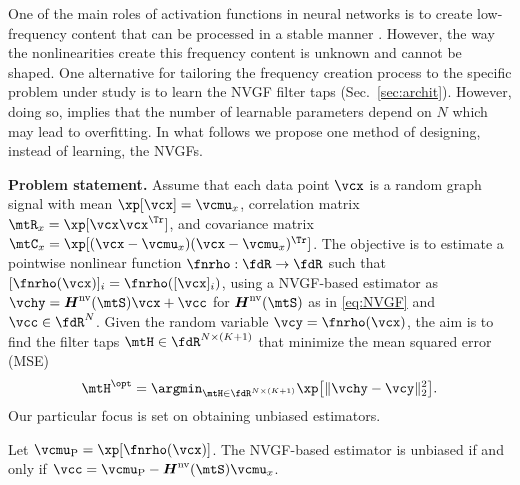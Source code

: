 

One of the main roles of activation functions in neural networks is to create low-frequency content that can be processed in a stable manner \cite{Mallat2012-Scattering}. However, the way the nonlinearities create this frequency content is unknown and cannot be shaped. One alternative for tailoring the frequency creation process to the specific problem under study is to learn the NVGF filter taps (Sec.~\ref{sec:archit}). However, doing so, implies that the number of learnable parameters depend on $N$ which may lead to overfitting. In what follows we propose one method of designing, instead of learning, the NVGFs.

\textbf{Problem statement.} Assume that each data point $\vcx$ is a random graph signal with mean $\xp[\vcx] = \vcmu_{x}$, correlation matrix $\mtR_{x} = \xp[\vcx \vcx^{\Tr}]$, and covariance matrix $\mtC_{x} = \xp[(\vcx-\vcmu_{x})(\vcx-\vcmu_{x})^{\Tr}]$. The objective is to estimate a pointwise nonlinear function $\fnrho: \fdR \to \fdR$ such that $[\fnrho(\vcx)]_{i} = \fnrho([\vcx]_{i})$, using a NVGF-based estimator as $\vchy = \mtfnH^{\text{nv}}(\mtS) \vcx + \vcc$ for $\mtfnH^{\text{nv}}(\mtS)$ as in \eqref{eq:NVGF} and $\vcc \in \fdR^{N}$. Given the random variable $\vcy = \fnrho(\vcx)$, the aim is to find the filter taps $\mtH \in \fdR^{N \times (K+1)}$ that minimize the mean squared error (MSE)
\begin{equation} \label{eq:Hopt}
    \mtH^{\opt} = \argmin_{\mtH \in \fdR^{N \times (K+1)}} \xp \big[ \| \vchy - \vcy \|_{2}^{2} \big].
\end{equation}
%
Our particular focus is set on obtaining unbiased estimators.

\begin{lemma} \label{l:unbiased}
Let $\vcmu_{\rho} = \xp[\fnrho(\vcx)]$. The NVGF-based estimator is unbiased if and only if $\vcc = \vcmu_{\rho} - \mtfnH^{\text{nv}}(\mtS) \vcmu_{x}$.
\end{lemma}

